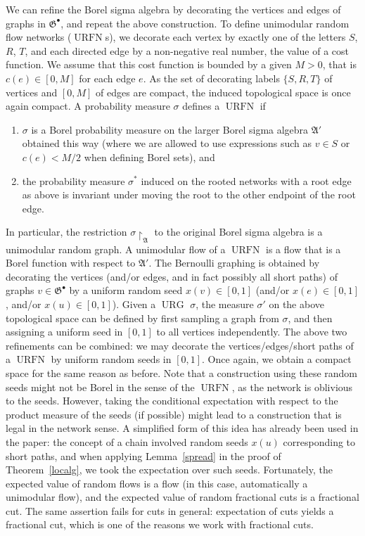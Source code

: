 \documentclass[12pt,a4paper]{article}
\renewcommand{\:}{\colon}
\DeclareMathOperator{\URG}{URG}
\DeclareMathOperator{\URN}{URFN}
\begin{document}
We can refine the Borel sigma algebra by decorating the vertices and edges of graphs in $\mathfrak{G}^\bullet$, and repeat the above construction. 
To define unimodular random flow networks ($\URN$s), we decorate each vertex by exactly one of the letters $S$, $R$, $T$, and each directed edge by a non-negative real number, the value of a cost function. 
We assume that this cost function is bounded by a given $M>0$, that is $c(e) \in [0,M]$ for each edge $e$. 
As the set of decorating labels $\{S,R,T\}$ of vertices and $[0,M]$ of edges are compact, the induced topological space is once again compact. 
A probability measure $\sigma$ defines a $\URN$ if 
\begin{enumerate}
\item $\sigma$ is a Borel probability measure on the larger Borel sigma algebra $\mathfrak{A}'$ obtained this way (where we are allowed to use expressions such as $v\in S$ or $c(e)<M/2$ when defining Borel sets), and 
\item the probability measure $\sigma^*$ induced on the rooted networks with a root edge as above is invariant under moving the root to the other endpoint of the root edge. 
\end{enumerate}
In particular, the restriction $\sigma\upharpoonright_\mathfrak{A}$ to the original Borel sigma algebra is a unimodular random graph. 
A unimodular flow of a $\URN$ is a flow that is a Borel function with respect to $\mathfrak{A}'$. 
The Bernoulli graphing is obtained by decorating the vertices (and/or edges, and in fact possibly all short paths) of graphs $v\in \mathfrak{G}^\bullet$ by a uniform random seed $x(v)\in [0,1]$ (and/or $x(e)\in [0,1]$, and/or $x(u)\in [0,1]$). 
Given a $\URG$ $\sigma$, the measure $\sigma'$ on the above topological space can be defined by first sampling a graph from $\sigma$, and then assigning a uniform seed in $[0,1]$ to all vertices independently. 
The above two refinements can be combined: we may decorate the vertices/edges/short paths of a $\URN$ by uniform random seeds in $[0,1]$. 
Once again, we obtain a compact space for the same reason as before. 
Note that a construction using these random seeds might not be Borel in the sense of the $\URN$, as the network is oblivious to the seeds. 
However, taking the conditional expectation with respect to the product measure of the seeds (if possible) might lead to a construction that is legal in the network sense. 
A simplified form of this idea has already been used in the paper: the concept of a chain involved random seeds $x(u)$ corresponding to short paths, and when applying Lemma~\ref{spread} in the proof of Theorem~\ref{localg}, we took the expectation over such seeds. 
Fortunately, the expected value of random flows is a flow (in this case, automatically a unimodular flow), and the expected value of random fractional cuts is a fractional cut. 
The same assertion fails for cuts in general: expectation of cuts yields a fractional cut, which is one of the reasons we work with fractional cuts. 
\end{document}
